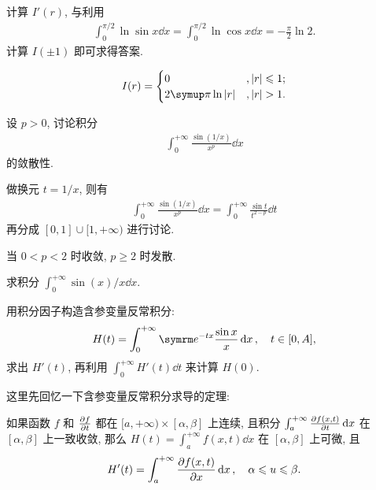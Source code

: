 \begin{exercise}[series=exer]
\begin{hint}
        计算 $ I'(r) $, 与利用
        \begin{align*}
            \int_{0}^{\pi/2} \ln \sin x \dd{x} = \int_{0}^{\pi/2} \ln \cos x\dd{x} = -\frac{\pi}{2}\ln 2.
        \end{align*}
        计算 $ I(\pm 1) $ 即可求得答案.
    \end{hint}
    \begin{answer}
        \begin{align*}
            I(r) = \begin{cases}
                0 & , \abs{r} \le 1;\\
                2\pi \ln \abs{r} & , \abs{r} > 1.
            \end{cases}
        \end{align*}
    \end{answer}
    \item 设 $ p > 0 $, 讨论积分
    \begin{align*}
        \int_{0}^{+\infty} \frac{\sin(1/x)}{x^{p}} \dd{x}
    \end{align*}
    的敛散性. 
    \begin{hint}
        做换元 $ t = 1/x $, 则有
        \begin{align*}
            \int_{0}^{+\infty} \frac{\sin(1/x)}{x^{p}} \dd{x} = \int_{0}^{+\infty} \frac{\sin t}{t^{2 - p}} \dd{t}
        \end{align*}
        再分成 $ [0, 1]\cup[1, +\infty) $ 进行讨论.
    \end{hint}
    \begin{answer}
        当 $ 0 < p < 2 $ 时收敛, $ p \ge 2 $ 时发散.
    \end{answer}
    \item 求积分 $ \int_{0}^{+\infty} \sin(x)/x \dd{x} $.
    \begin{hint}
        用积分因子构造含参变量反常积分:
        \begin{align*}
            H(t) = \int_{0}^{+\infty} \me^{-tx}\frac{\sin x}{x} \dd{x}, \quad t\in [0, A],
        \end{align*}
        求出 $ H'(t) $, 再利用 $ \int_{0}^{+\infty}H'(t)\dd{t} $ 来计算 $ H(0) $.
    \end{hint}
    \begin{answer}
        这里先回忆一下含参变量反常积分求导的定理:

        如果函数 $ f $ 和 $ \pdv{f}{t} $ 都在 $ [a, +\infty) \times [\alpha, \beta] $ 上连续, 且积分 $ \int_{a}^{+\infty} \pdv{f(x, t)}{t} \dd{x} $ 在 $ [\alpha, \beta] $ 上一致收敛, 那么 $ H(t) = \int_{a}^{+\infty}f(x, t)\dd{x} $ 在 $ [\alpha, \beta] $ 上可微, 且
        \begin{align*}
            H'(t) = \int_{a}^{+\infty}\pdv{f(x, t)}{x}\dd{x},\quad \alpha \leqslant u \leqslant \beta.
        \end{align*}


\end{answer}
\end{exercise}
